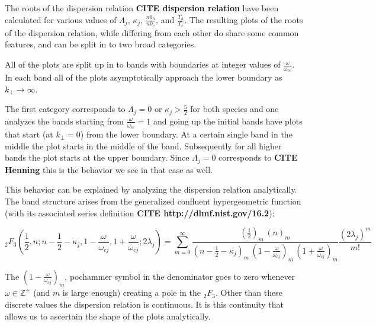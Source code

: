 \documentclass[12pt,a4paper]{article}
\begin{document}
    The roots of the dispersion relation \textbf{CITE dispersion relation} have been calculated for various values of $\Lambda_j$, $\kappa_j$, $\frac{n0_h}{n0_e}$, and $\frac{T_h}{T_c}$.
    The resulting plots of the roots of the dispersion relation, while differing from each other do share some common features, and can be split in to two broad categories.

    All of the plots are split up in to bands with boundaries at integer values of $\frac{\omega}{\omega_{ce}}$.
    In each band all of the plots asymptotically approach the lower boundary as $k_\perp \rightarrow \infty$.

    The first category corresponds to $\Lambda_j = 0$ or $\kappa_j > \frac{5}{2}$ for both species and one analyzes the bands starting from $\frac{\omega}{\omega_{ce}} = 1$ and going up the initial bands have plots that start (at $k_\perp = 0$) from the lower boundary. At a certain single band in the middle the plot starts in the middle of the band.
    Subsequently for all higher bands the plot starts at the upper boundary.
    Since $\Lambda_j = 0$ corresponds to \textbf{CITE Henning} this is the behavior we see in that case as well.

    This behavior can be explained by analyzing the dispersion relation analytically.
    The band structure arises from the generalized confluent hypergeometric function (with its associated series definition \textbf{CITE http://dlmf.nist.gov/16.2}):

    \begin{equation}
        _2F_3\left(\frac{1}{2}, n; n - \frac{1}{2} - \kappa_j, 1 - \frac{\omega}{\omega_{cj}}, 1 + \frac{\omega}{\omega_{cj}}; 2 \lambda_j \right) = \sum_{m = 0}^{\infty} \frac{(\frac{1}{2})_m \, (n)_m}{(n - \frac{1}{2} - \kappa_j)_m \, (1 - \frac{\omega}{\omega_{cj}})_m \, (1 + \frac{\omega}{\omega_{cj}})_m} \frac{(2 \lambda_j)^m}{m!}
    \end{equation}

    The $(1 - \frac{\omega}{\omega_{cj}})_m$, pochammer symbol in the denominator goes to zero whenever $\omega \in \mathbb{Z}^+$ (and $m$ is large enough) creating a pole in the $_2F_3$.
    Other than these discrete values the dispersion relation is continuous.
    It is this continuity that allows us to ascertain the shape of the plots analytically.
\end{document}
